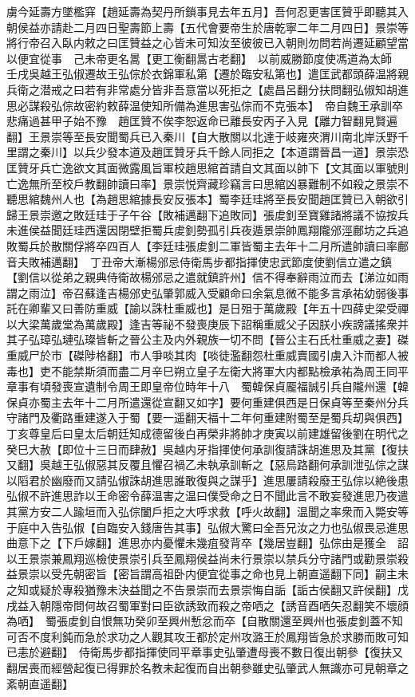 虜今延壽方墜檻穽【趙延壽為契丹所鎖事見去年五月】吾何忍更害匡贊乎即聽其入朝侯益亦請赴二月四日聖壽節上壽【五代會要帝生於唐乾寧二年二月四日】景崇等將行帝召入臥内敕之曰匡贊益之心皆未可知汝至彼彼已入朝則勿問若尚遷延顧望當以便宜從事　己未帝更名暠【更工衡翻暠古老翻】　以前威勝節度使馮道為太師　壬戌吳越王弘俶遷故王弘倧於衣錦軍私第【遷於臨安私第也】遣匡武都頭薛温將親兵衛之潜戒之曰若有非常處分皆非吾意當以死拒之【處昌呂翻分扶問翻弘俶知胡進思必謀殺弘倧故密約敕薛温使知所備為進思害弘倧而不克張本】　帝自魏王承訓卒悲痛過甚甲子始不豫　趙匡贊不俟李恕返命已離長安丙子入見【離力智翻見賢遍翻】王景崇等至長安聞蜀兵已入秦川【自大散關以北達于岐雍夾渭川南北岸沃野千里謂之秦川】以兵少發本道及趙匡贊牙兵千餘人同拒之【本道謂晉昌一道】景崇恐匡贊牙兵亡逸欲文其面微露風旨軍校趙思綰首請自文其面以帥下【文其面以軍號則亡逸無所至校戶教翻帥讀曰率】景崇悦齊藏珍竊言曰思綰凶暴難制不如殺之景崇不聽思綰魏州人也【為趙思綰據長安反張本】蜀李廷珪將至長安聞趙匡贊已入朝欲引歸王景崇邀之敗廷珪于子午谷【敗補邁翻下追敗同】張䖍釗至寶雞諸將議不協按兵未進侯益聞廷珪西還因閉壁拒蜀兵䖍釗勢孤引兵夜遁景崇帥鳳翔隴邠涇鄜坊之兵追敗蜀兵於散關俘將卒四百人【李廷珪張䖍釗二軍皆蜀主去年十二月所遣帥讀曰率鄜音夫敗補邁翻】　丁丑帝大漸楊邠忌侍衛馬步都指揮使忠武節度使劉信立遣之鎮【劉信以從弟之親典侍衛故楊邠忌之遣就鎮許州】信不得奉辭雨泣而去【涕泣如雨謂之雨泣】帝召蘇逢吉楊邠史弘肇郭威入受顧命曰余氣息微不能多言承祐幼弱後事託在卿輩又曰善防重威【諭以誅杜重威也】是日殂于萬歲殿【年五十四薛史梁受禪以大梁萬歲堂為萬歲殿】逢吉等祕不發喪庚辰下詔稱重威父子因朕小疾謗議搖衆并其子弘璋弘璉弘璨皆斬之晉公主及内外親族一切不問【晉公主石氏杜重威之妻】磔重威尸於市【磔陟格翻】市人爭啖其肉【啖徒濫翻怨杜重威賣國引虜入汴而都人被毒也】吏不能禁斯須而盡二月辛巳朔立皇子左衛大將軍大内都點檢承祐為周王同平章事有頃發喪宣遺制令周王即皇帝位時年十八　蜀韓保貞龎福誠引兵自隴州還【韓保貞亦蜀主去年十二月所遣還從宣翻又如字】要何重建俱西是日保貞等至秦州分兵守諸門及衢路重建遂入于蜀【要一遥翻天福十二年何重建附蜀至是蜀兵刧與俱西】　丁亥尊皇后曰皇太后朝廷知成德留後白再榮非將帥才庚寅以前建雄留後劉在明代之　癸巳大赦【即位十三日而肆赦】吳越内牙指揮使何承訓復請誅胡進思及其黨【復扶又翻】吳越王弘俶惡其反覆且懼召禍乙未執承訓斬之【惡烏路翻何承訓泄弘倧之謀以䧟君於幽廢而又請弘俶誅胡進思誰敢復與之謀乎】進思屢請殺廢王弘倧以絶後患弘俶不許進思詐以王命密令薛温害之温曰僕受命之日不聞此言不敢妄發進思乃夜遣其黨方安二人踰垣而入弘倧闔戶拒之大呼求救【呼火故翻】温聞之率衆而入斃安等于庭中入告弘俶【自臨安入錢唐告其事】弘俶大驚曰全吾兄汝之力也弘俶畏忌進思曲意下之【下戶嫁翻】進思亦内憂懼未幾疽發背卒【幾居豈翻】弘倧由是獲全　詔以王景崇兼鳳翔巡檢使景崇引兵至鳳翔侯益尚未行景崇以禁兵分守諸門或勸景崇殺益景崇以受先朝密旨【密旨謂高祖卧内便宜從事之命也見上朝直遥翻下同】嗣主未之知或疑於專殺猶豫未決益聞之不告景崇而去景崇悔自詬【詬古侯翻又許侯翻】戊戌益入朝隱帝問何故召蜀軍對曰臣欲誘致而殺之帝哂之【誘音酉哂矢忍翻笑不壞顔為哂】　蜀張䖍釗自恨無功癸卯至興州慙忿而卒【自散關還至興州也張䖍釗蓋不知可否不度利鈍而急於求功之人觀其攻王都於定州攻潞王於鳳翔皆急於求勝而敗可知已恚於避翻】　侍衛馬步都指揮使同平章事史弘肇遭母喪不數日復出朝參【復扶又翻居喪而經營起復已得罪於名教未起復而自出朝參雖史弘肇武人無識亦可見朝章之紊朝直遥翻】

